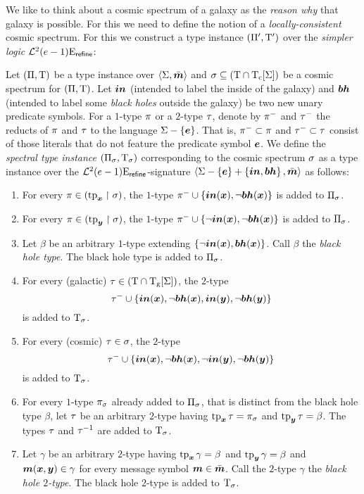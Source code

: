 We like to think about a cosmic spectrum of a galaxy as the \emph{reason why}
that galaxy is possible. For this we need to define the notion of a
\emph{locally-consistent} cosmic spectrum. For this we construct a type instance
$(\Pi',\mathrm{T}')$ over the \emph{simpler logic}
$\mathcal{L}^{2}_{{}}{(e-1)}\mathrm{E}_{\mathsf{refine}}$:
\begin{definition}
Let $(\Pi,\mathrm{T})$ be a type instance over $\left\langle \mathrm{\Sigma},\bar{\bm{m}} \right\rangle$ and $\sigma
\subseteq (\mathrm{T} \cap \mathrm{T}_{\mathrm{c}}[\mathrm{\Sigma}])$ be a cosmic spectrum for $(\Pi,\mathrm{T})$.
Let $\bm{in}$ (intended to label the inside of the galaxy) and $\bm{bh}$ (intended to
label some \emph{black holes} outside the galaxy) be two new unary predicate
symbols.
For a $1$-type $\pi$ or a $2$-type $\tau$, denote by $\pi^{-}$ and $\tau^{-}$ the reducts of $\pi$ and
$\tau$ to the language $\mathrm{\Sigma} - \left\{\bm{e}\right\}$.
That is, $\pi^{-} \subset \pi$ and $\tau^{-} \subset \tau$ consist of
those literals that do not feature the predicate symbol $\bm{e}$.
We define the \emph{spectral type instance} $(\Pi_\sigma,\mathrm{T}_\sigma)$
corresponding to the cosmic spectrum $\sigma$ as a type instance over
the $\mathcal{L}^{2}_{{}}{(e-1)}\mathrm{E}_{\mathsf{refine}}$-signature 
$\left\langle \mathrm{\Sigma} - \left\{\bm{e}\right\} + \left\{\bm{in},\bm{bh}\right\},\bar{\bm{m}} \right\rangle$ as follows:
\begin{enumerate}
  \item For every $\pi \in (\operatorname{tp}_{\bm{x}}\restriction\sigma)$, the $1$-type
  $\pi^{-} \cup \left\{\bm{in}(\bm{x}),\lnot\bm{bh}(\bm{x})\right\}$ is added to $\Pi_\sigma$.
  \item For every $\pi \in (\operatorname{tp}_{\bm{y}}\restriction\sigma)$, the $1$-type
  $\pi^{-} \cup \left\{\lnot\bm{in}(\bm{x}),\lnot\bm{bh}(\bm{x})\right\}$ is added to $\Pi_\sigma$.
  \item Let $\beta$ be an arbitrary $1$-type extending
  $\left\{\lnot\bm{in}(\bm{x}),\bm{bh}(\bm{x})\right\}$. Call $\beta$ the \emph{black hole type}.
  The black hole type is added to $\Pi_\sigma$.
  \item For every (galactic) $\tau \in (\mathrm{T} \cap \mathrm{T}_{\mathrm{g}}[\mathrm{\Sigma}])$, the $2$-type
  \[
    \tau^{-} \cup \left\{\bm{in}(\bm{x}),\lnot\bm{bh}(\bm{x}),\bm{in}(\bm{y}),\lnot\bm{bh}(\bm{y})\right\}
  \]
  is added to $\mathrm{T}_\sigma$.
  \item For every (cosmic) $\tau \in \sigma$, the $2$-type
  \[
    \tau^{-} \cup \left\{\bm{in}(\bm{x}),\lnot\bm{bh}(\bm{x}),\lnot\bm{in}(\bm{y}),\lnot\bm{bh}(\bm{y})\right\}  
  \] is added to $\mathrm{T}_\sigma$.
  \item For every $1$-type $\pi_\sigma$ already added to $\Pi_\sigma$, that is
  distinct from the black hole type $\beta$,
  let $\tau$ be an arbitrary $2$-type having $\operatorname{tp}_{\bm{x}}\tau = \pi_\sigma$ and
  $\operatorname{tp}_{\bm{y}}\tau = \beta$. The types $\tau$ and $\tau^{-1}$ are added to
  $\mathrm{T}_\sigma$.
  \item Let $\gamma$ be an arbitrary $2$-type having $\operatorname{tp}_{\bm{x}}\gamma = \beta$ and
  $\operatorname{tp}_{\bm{y}}\gamma = \beta$ and $\bm{m}(\bm{x},\bm{y}) \in \gamma$ for every message symbol
  $\bm{m} \in \bar{\bm{m}}$. Call the $2$-type $\gamma$ the \emph{black hole $2$-type}. The
  black hole $2$-type is added to $\mathrm{T}_\sigma$.
\end{enumerate}
\end{definition}
